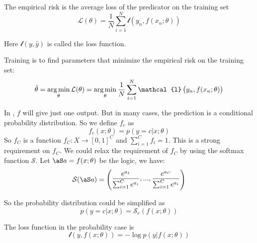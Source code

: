 \begin{definition}\label{empirical_risk}
    The empirical risk is the average loss of the predicator on the training set
    \begin{equation}
        \mathcal{L}(\theta) = \frac{1}{N} \sum_{i=1}^N \mathcal{l}\left( y_n, f(x_n; \theta) \right)
    \end{equation}
    
    Here $\mathcal{l}(y, \hat{y})$ is called the loss function.
\end{definition}

\begin{definition}[Training]
    Training is to find parameters that minimize the empirical risk on the training set:
    \begin{equation}
        \hat{\theta} = \argmin{\theta}\mathcal{L}(\theta) = \argmin{\theta} \frac{1}{N} \sum_{i=1}^N \mathcal{l}\left( y_n, f(x_n; \theta) \right)
    \end{equation}
\end{definition}

\begin{definition}
    In , $f$ will give just one output. But in many cases, the prediction is a conditional probability distribution. So we define $f_c$ as
    \begin{equation}
        f_c(x;\theta) = p(y=c|x;\theta)
    \end{equation}
    So $f_C$ is a function $f_C: X \rightarrow [0,1]^C$ and $\displaystyle \sum_{i=1}^C f_i = 1$. This is a strong requirement on $f_C$. We could relax the requirement of $f_C$ by using the softmax function $\mathcal{S}$. Let $\columnvector{a} = f(x;\theta)$ be the logic, we have:
    \begin{equation}
        \mathcal{S}(\columnvector{a}) = \begin{pmatrix}\displaystyle
            \frac{e^{a_1}}{\sum_{i=1}^C e^{a_i}}, ..., \frac{e^{a_C}}{\sum_{i=1}^C e^{a_i}}
        \end{pmatrix}
    \end{equation}
    
    So the probability distribution could be simplified as
    \begin{equation}
        p(y=c|x;\theta) = \mathcal{S}_c \left(f(x;\theta)\right)
    \end{equation}
    
    The loss function in the probability case is 
    \begin{equation}
        \mathcal{l}(y, f(x;\theta)) = - \log p(y|f(x;\theta))
    \end{equation}
\end{definition}

